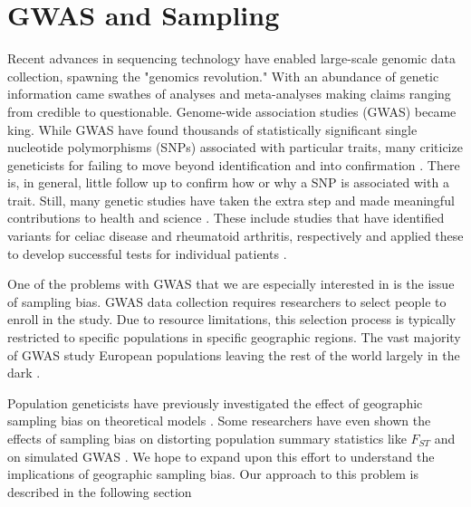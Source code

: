 \section{GWAS and Sampling}
Recent advances in sequencing technology have enabled large-scale genomic data collection, spawning the "genomics revolution." With an abundance of genetic information came swathes of analyses and meta-analyses making claims ranging from credible to questionable.\cite{ganna_large-scale_2019} Genome-wide association studies (GWAS) became king. While GWAS have found thousands of statistically significant single nucleotide polymorphisms (SNPs) associated with particular traits, many criticize geneticists for failing to move beyond identification and into confirmation \cite{visscher_five_2012}. There is, in general, little follow up to confirm how or why a SNP is associated with a trait. Still, many genetic studies have taken the extra step and made meaningful contributions to health and science \cite{belbin_2017}. These include studies that have identified variants for celiac disease and rheumatoid arthritis, respectively and applied these to develop successful tests for individual patients \cite{abraham_accurate_2014} \cite{han_fine_2014}. 


One of the problems with GWAS that we are especially interested in is the issue of sampling bias. GWAS data collection requires researchers to select people to enroll in the study. Due to resource limitations, this selection process is typically restricted to specific populations in specific geographic regions. The vast majority of GWAS study European populations \cite{need_next_2009} \cite{popejoy_genomics_2016} leaving the rest of the world largely in the dark \cite{wojcik_genetic_2019}. 


Population geneticists have previously investigated the effect of geographic sampling bias on theoretical models \cite{mcvean_genealogical_2009}. Some researchers have even shown the effects of sampling bias on distorting population summary statistics like $F_{ST}$ and on simulated GWAS \cite{battey_space_2019}. We hope to expand upon this effort to understand the implications of geographic sampling bias. Our approach to this problem is described in the following section


